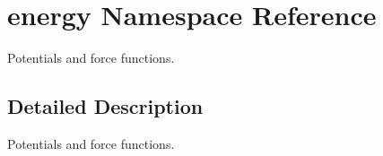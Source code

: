 \hypertarget{namespaceenergy}{}\section{energy Namespace Reference}
\label{namespaceenergy}


Potentials and force functions.  




\subsection{Detailed Description}
Potentials and force functions. 